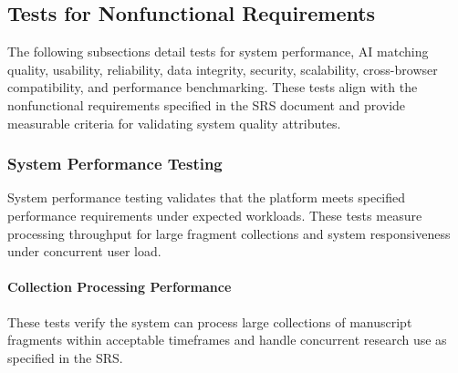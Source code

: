 \documentclass[12pt, titlepage]{article}
\begin{document}
\subsection{Tests for Nonfunctional Requirements}

The following subsections detail tests for system performance, AI matching quality, usability, reliability, data integrity, security, scalability, cross-browser compatibility, and performance benchmarking. These tests align with the nonfunctional requirements specified in the SRS document and provide measurable criteria for validating system quality attributes.

\subsubsection{System Performance Testing}

System performance testing validates that the platform meets specified performance requirements under expected workloads. These tests measure processing throughput for large fragment collections and system responsiveness under concurrent user load.

\paragraph{Collection Processing Performance}

These tests verify the system can process large collections of manuscript fragments within acceptable timeframes and handle concurrent research use as specified in the SRS.
\end{document}
